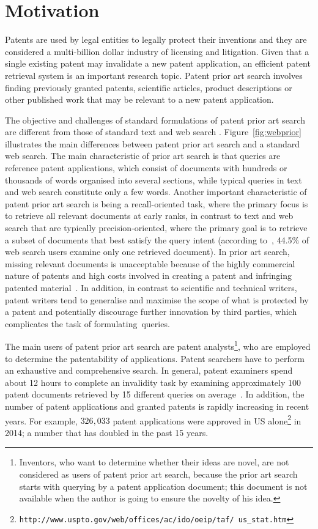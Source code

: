 \section{Motivation}
\label{sec:Motivation}
Patents are used by legal entities to legally protect their inventions and they are considered a multi-billion dollar industry of licensing and litigation. Given that a single existing patent may invalidate a new patent application, an efficient patent retrieval system is an important research topic. 
Patent prior art search involves finding previously granted patents, scientific articles, product
descriptions or other published work that may be relevant to a new patent application. 

The objective and challenges of standard formulations of patent prior art
search are different from those of standard text and web search \citep{magdy2012toward}.
Figure~\ref{fig:webprior} illustrates the main differences between 
patent prior art search and a standard web search.
The main characteristic of prior art search is that queries are reference patent
applications, which consist of documents with hundreds or thousands of
words organised into several sections, while typical queries in text
and web search constitute only a few words. 
Another important characteristic of patent prior art
search is being a recall-oriented task, where the primary focus is to
retrieve all relevant documents at early ranks, in contrast to text
and web search that are typically precision-oriented, where the primary goal is
to retrieve a subset of documents that best satisfy the query
intent (according to~\citep{zhang2010search}, 44.5\% of web search users examine only one retrieved document). 
In prior art search, missing relevant documents is unacceptable because of the highly commercial nature of patents and high costs involved
in creating a patent and infringing patented material~\citep{joho2010survey}. 
In addition, in contrast to scientific and technical writers, patent writers
tend to generalise and maximise the scope of what is protected by a
patent and potentially discourage further innovation by third parties,
which complicates the task of formulating~queries. 

The main users of patent prior art search are 
patent analysts\footnote{Inventors, who want to determine whether their ideas are novel, 
are not considered as users of patent prior art search, because the prior art search starts with querying by a patent application document; this document is not available when  the author is going to ensure the novelty of his idea.}, 
who are employed to determine the patentability 
of applications. 
Patent searchers have to perform an exhaustive and comprehensive search. In general, patent
examiners spend about 12 hours to complete an invalidity task by examining
approximately 100 patent documents retrieved by 15 different queries on average~\citep{joho2010survey}. 
In addition, the number of patent applications and granted patents is rapidly increasing in recent years. For example, $326,033$ patent applications were approved in US alone\footnote{\texttt{http://www.uspto.gov/web/offices/ac/ido/oeip/taf/ us\_stat.htm}} in 2014; a number that has doubled in the past 15 years.

